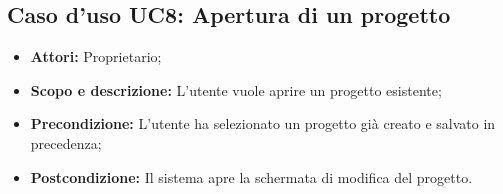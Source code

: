 \subsection{Caso d'uso UC8: Apertura di un progetto}
\begin{itemize}
	\item \textbf{Attori:} Proprietario;
	\item \textbf{Scopo e descrizione:} L'utente vuole aprire un progetto esistente;
	\item \textbf{Precondizione:} L'utente ha selezionato un progetto già creato e salvato in precedenza;
	\item \textbf{Postcondizione:} Il sistema apre la schermata di modifica del progetto.
\end{itemize}